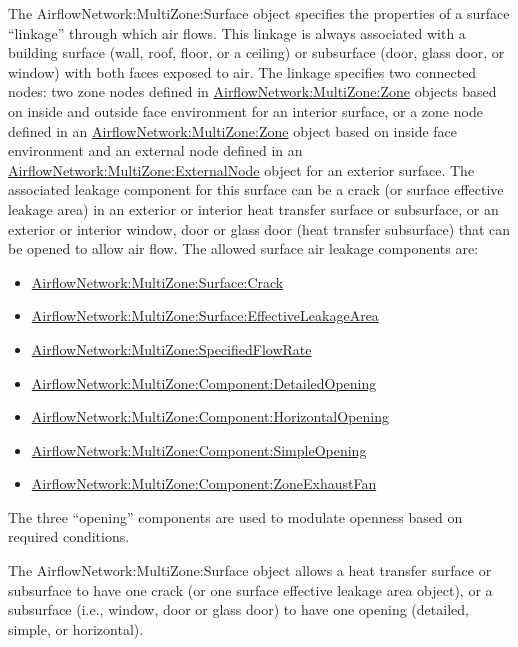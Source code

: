 The AirflowNetwork:MultiZone:Surface object specifies the properties of a surface ``linkage'' through which air flows. This linkage is always associated with a building surface (wall, roof, floor, or a ceiling) or subsurface (door, glass door, or window) with both faces exposed to air. The linkage specifies two connected nodes: two zone nodes defined in \hyperref[airflownetworkmultizonezone]{AirflowNetwork:MultiZone:Zone} objects based on inside and outside face environment for an interior surface, or a zone node defined in an \hyperref[airflownetworkmultizonezone]{AirflowNetwork:MultiZone:Zone} object based on inside face environment and an external node defined in an \hyperref[airflownetworkmultizoneexternalnode]{AirflowNetwork:MultiZone:ExternalNode} object for an exterior surface. The associated leakage component for this surface can be a crack (or surface effective leakage area) in an exterior or interior heat transfer surface or subsurface, or an exterior or interior window, door or glass door (heat transfer subsurface) that can be opened to allow air flow. The allowed surface air leakage components are:

\begin{itemize}
\item
  \hyperref[airflownetworkmultizonesurfacecrack]{AirflowNetwork:MultiZone:Surface:Crack}
\item
  \hyperref[airflownetworkmultizonesurfaceeffectiveleakagearea]{AirflowNetwork:MultiZone:Surface:EffectiveLeakageArea}
\item
  \hyperref[airflownetworkmultizonespecifiedflow]{AirflowNetwork:MultiZone:SpecifiedFlowRate}
\item
  \hyperref[airflownetworkmultizonecomponentdetailedopening]{AirflowNetwork:MultiZone:Component:DetailedOpening}
\item
  \hyperref[airflownetworkmultizonecomponenthorizontalopening]{AirflowNetwork:MultiZone:Component:HorizontalOpening}
\item
  \hyperref[airflownetworkmultizonecomponentsimpleopening]{AirflowNetwork:MultiZone:Component:SimpleOpening}
\item
  \hyperref[airflownetworkmultizonecomponentzoneexhaustfan]{AirflowNetwork:MultiZone:Component:ZoneExhaustFan}
\end{itemize}

The three ``opening'' components are used to modulate openness based on required conditions.

The AirflowNetwork:MultiZone:Surface object allows a heat transfer surface or subsurface to have one crack (or one surface effective leakage area object), or a subsurface (i.e., window, door or glass door) to have one opening (detailed, simple, or horizontal).


